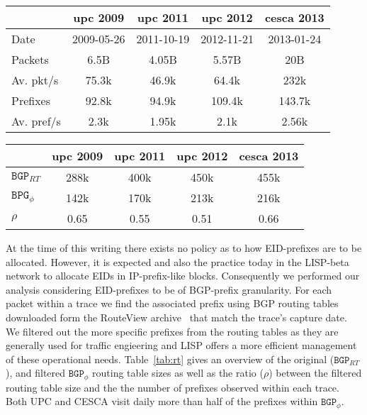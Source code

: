 \documentclass[twocolumn, 10pt]{article}
\theoremstyle{plain}
\begin{document}
\begin{table*}[t]
    \centering
    \caption{Datasets Statistics}
    \label{tab:traces}
    \begin{tabular}{lcccc}
        \toprule
                & \textbf{upc 2009} & \textbf{upc 2011} & \textbf{upc 2012} & \textbf{cesca 2013} \\ \midrule[0.09em]
        Date    & 2009-05-26 & 2011-10-19 & 2012-11-21 & 2013-01-24\\ \midrule 
        Packets & 6.5B & 4.05B & 5.57B & 20B \\ \midrule
        Av. pkt/s & 75.3k & 46.9k & 64.4k & 232k  \\ \midrule
        Prefixes  & 92.8k & 94.9k & 109.4k & 143.7k \\ \midrule
        Av. pref/s & 2.3k & 1.95k & 2.1k & 2.56k \\         
        \bottomrule
    \end{tabular}
\end{table*}

\begin{table*}[t]
    \centering
    \caption{Routing Tables Statistics}
    \label{tab:rt}
    \begin{tabular}{lcccc}
        \toprule
        & \textbf{upc 2009} & \textbf{upc 2011} & \textbf{upc 2012} & \textbf{cesca 2013} \\ \midrule[0.09em]
        $\texttt{BGP}_{RT}$ & 288k & 400k & 450k & 455k \\ \midrule
        $\texttt{BPG}_{\phi}$ & 142k & 170k & 213k & 216k \\ \midrule
        $\rho$ & 0.65 & 0.55 & 0.51 & 0.66 \\
        \bottomrule
    \end{tabular}
\end{table*}

At the time of this writing there exists no policy as to how EID-prefixes are
to be allocated. However, it is expected and also the practice today in the
LISP-beta network to allocate EIDs in IP-prefix-like blocks. Consequently we
performed our analysis considering EID-prefixes to be of BGP-prefix granularity. For each
packet within a trace we find the associated prefix using BGP routing tables
downloaded form the RouteView archive~\cite{routeviews} that match the trace's
capture date. We filtered out the more specific prefixes from the routing
tables as they are generally used for traffic engieering and LISP offers a
more efficient management of these operational needs. Table~\ref{tab:rt} gives
an overview of the original ($\texttt{BGP}_{RT}$), and filtered
$\texttt{BGP}_{\phi}$ routing table sizes as well as the ratio ($\rho$) between the
filtered routing table size and the the number of prefixes observed within
each trace. Both UPC and CESCA visit daily more than half of the prefixes
within $\texttt{BGP}_{\phi}$. 
\end{document}
